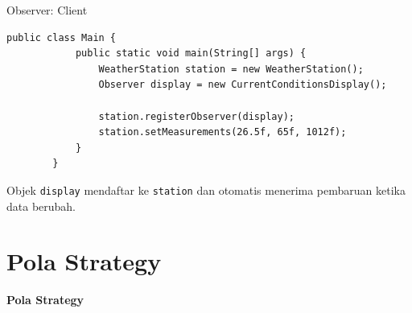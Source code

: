 \documentclass[aspectratio=169, table]{beamer}
\begin{document}
\begin{frame}[fragile]{Observer: Client}
	\begin{lstlisting}[style=JavaStyle]
		public class Main {
			public static void main(String[] args) {
				WeatherStation station = new WeatherStation();
				Observer display = new CurrentConditionsDisplay();
				
				station.registerObserver(display);
				station.setMeasurements(26.5f, 65f, 1012f);
			}
		}
	\end{lstlisting}
	\small Objek \texttt{display} mendaftar ke \texttt{station} dan otomatis menerima pembaruan ketika data berubah.
\end{frame}


\section{Pola Strategy}

\begin{frame}{\hfill}
	\centering
	\textbf{\Huge{Pola Strategy}}
\end{frame}
\end{document}
